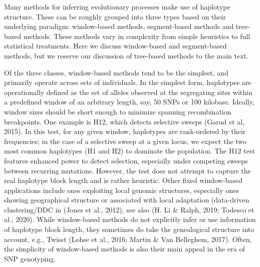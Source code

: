 \documentclass[twocolumn]{bmcart}%
\begin{document}
\begin{strip}
\begin{tcolorbox}[colback=blue!5!white,colframe=blue!50!black,title= Box 2: Population genetic methods that make use of haplotype information]
\footnotesize{Many methods for inferring evolutionary processes make use of haplotype structure. These can be roughly grouped into three types based on their underlying paradigm: window-based methods, segment-based methods and tree-based methods. These methods vary in complexity from simple heuristics to full statistical treatments. Here we discuss window-based and segment-based methods, but we reserve our discussion of tree-based methods to the main text.

Of the three classes, window-based methods tend to be the simplest, and primarily operate across sets of individuals. In the simplest form, haplotypes are operationally defined as the set of alleles observed at the segregating sites within a predefined window of an arbitrary length, say, 50 SNPs or 100 kilobase. Ideally, window sizes should be short enough to minimize spanning recombination breakpoints. One example is H12, which detects selective sweeps (Garud et al, 2015). In this test, for any given window, haplotypes are rank-ordered by their frequencies; in the case of a selective sweep at a given locus, we expect the two most common haplotypes (H1 and H2) to dominate the population. The H12 test features enhanced power to detect selection, especially under competing sweeps between recurring mutations. However, the test does not attempt to capture the real haplotype block length and is rather heuristic. Other fixed window-based applications include ones exploiting local genomic structures, especially ones showing geographical structure or associated with local adaptation (data-driven clustering/DDC in (Jones et al., 2012), see also (H. Li \& Ralph, 2019; Todesco et al., 2020). While window-based methods do not explicitly infer or use information of haplotype block length, they sometimes do take the genealogical structure into account, e.g., Twisst (Lohse et al., 2016; Martin \& Van Belleghem, 2017). Often, the simplicity of window-based methods is also their main appeal in the era of SNP genotyping.

}
\end{tcolorbox}
\end{strip}
\end{document}
